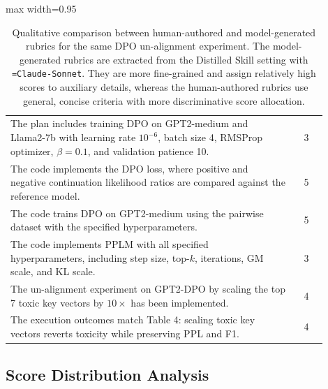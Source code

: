 \documentclass[11pt]{article}
\newcommand{\hyphentt}[1]{\texttt{\hyphenchar\font=\defaulthyphenchar #1}}
\begin{document}
\begin{table}[t]
\begin{adjustbox}{max width=0.95\textwidth}
\begin{tabular}{p{0.9\linewidth}c}
            The plan includes training DPO on GPT2-medium and Llama2-7b with learning rate $10^{-6}$, batch size 4, RMSProp optimizer, $\beta=0.1$, and validation patience 10. & 3 \\

            The code implements the DPO loss, where positive and negative continuation likelihood ratios are compared against the reference model. & 5 \\

            The code trains DPO on GPT2-medium using the pairwise dataset with the specified hyperparameters. & 5 \\

            The code implements PPLM with all specified hyperparameters, including step size, top-$k$, iterations, GM scale, and KL scale. & 3 \\

            The un-alignment experiment on GPT2-DPO by scaling the top 7 toxic key vectors by $10\times$ has been implemented. & 4 \\

            The execution outcomes match Table 4: scaling toxic key vectors reverts toxicity while preserving PPL and F1. & 4 \\

            \bottomrule

        \end{tabular}
        \end{adjustbox}
    \vspace{-0.5em}
    \caption{Qualitative comparison between human-authored and model-generated rubrics for the same DPO un-alignment experiment. The model-generated rubrics are extracted from the Distilled Skill setting with \hyphentt{Claude-Sonnet}. They are more fine-grained and assign relatively high scores to auxiliary details, whereas the human-authored rubrics use general, concise criteria with more discriminative score allocation.}
    \label{tab:qualitative_analysis}
    \vspace{-1.5em}
\end{table}

\subsection{Score Distribution Analysis}
\end{document}
